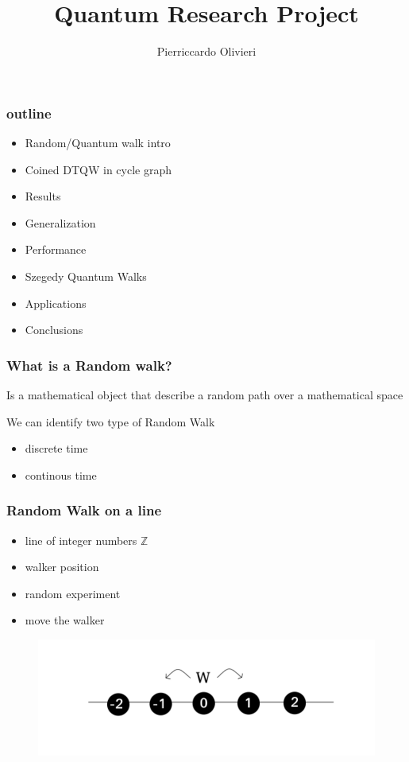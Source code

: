 \documentclass{beamer}
\title{Quantum Research Project}
\author{Pierriccardo Olivieri}
\institute{Politecnico di Milano}
\begin{document}
\maketitle


\begin{frame}
    \frametitle{outline}
    \begin{itemize}
        \item Random/Quantum walk intro
        \item Coined DTQW in cycle graph 
        \item Results
        \item Generalization
        \item Performance
        \item Szegedy Quantum Walks
        \item Applications 
        \item Conclusions
    \end{itemize}
\end{frame}

\begin{frame}
    \frametitle{What is a Random walk?}
    \begin{definition}
        Is a mathematical object that describe a random path over a mathematical space 
    \end{definition}
    We can identify two type of Random Walk
    \begin{itemize}
        \item discrete time 
        \item continous time 
    \end{itemize}
    
\end{frame}

\begin{frame}
    \frametitle{Random Walk on a line}
    \begin{example}
        \begin{itemize}
            \item line of integer numbers $\mathbb{Z}$
            \item walker position
            \item random experiment
            \item move the walker
        \end{itemize}
    \end{example}

    \begin{figure}[h!]
        \includegraphics[scale=0.3]{img/random_walk_line.png}
        \centering
    \end{figure}
\end{frame}
\end{document}
